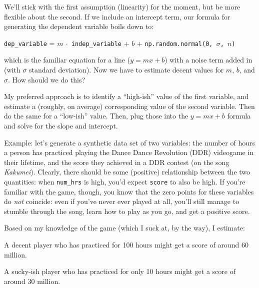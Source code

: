 We'll stick with the first assumption (linearity) for the moment, but be more
flexible about the second. If we include an intercept term, our formula for
generating the dependent variable boils down to:

\begin{center}

\texttt{dep\_variable} = $m \ \cdot$ \texttt{indep\_variable} + $b$ +
\texttt{np.random.normal(0, $\sigma$, $n$)}

\end{center}


which is the familiar equation for a line ($y=mx+b$) with a noise term added
in (with $\sigma$ standard deviation). Now we have to estimate decent values
for $m$, $b$, and $\sigma$. How should we do this?

\medskip

My preferred approach is to identify a ``high-ish'' value of the first
variable, and estimate a (roughly, on average) corresponding value of the
second variable. Then do the same for a ``low-ish'' value. Then, plug those
into the $y=mx+b$ formula and solve for the slope and intercept.

Example: let's generate a synthetic data set of two variables: the number of
hours a person has practiced playing the Dance Dance Revolution (DDR) videogame
in their lifetime, and the score they achieved in a DDR contest (on the song
\textit{Kakumei}). Clearly, there should be some (positive) relationship
between the two quantities: when \texttt{num\_hrs} is high, you'd expect
\texttt{score} to also be high. If you're familiar with the game, though, you
know that the zero points for these variables do \textit{not} coincide: even if
you've never ever played at all, you'll still manage to stumble through the
song, learn how to play as you go, and get a positive score.

Based on my knowledge of the game (which I suck at, by the way), I estimate: 

\begin{compactitem}

\item A decent player who has practiced for 100 hours might get a score of
around 60 million.

\item A sucky-ish player who has practiced for only 10 hours might
get a score of around 30 million.

\end{compactitem}

